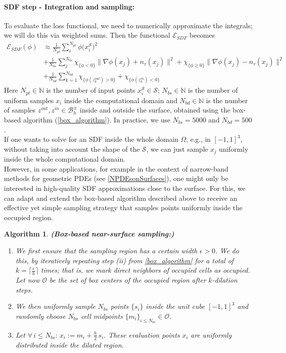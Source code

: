 \documentclass[draft,12pt,openany]{book}
\def\S{\mathcal{S}}
\theoremstyle{plainnormal}
\newtheorem{algorithm}[theorem]{Algorithm}
\theoremstyle{remark}
\begin{document}
\paragraph{SDF step - Integration and sampling:} To evaluate the loss functional, we need to numerically approximate the integrals; we will do this via weighted sums. Then the functional $\mathcal{E}_{SDF}$ becomes
\begin{align*}
    \mathcal{E}_{SDF}(\phi) &\approx 
 \frac{1}{N_{pt}}\sum_i^{N_{pt}}\phi\big( x_i^\S\big)^2\\ &+ \frac{1}{N_{bs}}\sum_j^{N_{bs}}
\chi_{\{\phi < 0\}} \|\nabla \phi(x_j) + n_\tau(x_j)\|^2 + \chi_{\{\phi \geq 0\}} \|\nabla \phi(x_j) - n_\tau(x_j)\|^2  \\&+\frac{1}{N_{bd}} \sum^{N_{bd}}_{k = 1}\chi_{\{\phi(z^{out}_k) > 0\}} + \chi_{\{\phi(z^{in}_k) < 0\}}
\end{align*}
Here $N_{pt}\in \mathbb{N}$ is the number of input points $x_i^\S \in \mathcal S$;  $N_{bs}\in \mathbb{N}$ is the number of uniform samples $x_i$ inside the computational domain and $N_{bd}\in \mathbb{N}$ is the number of samples $z^{out}, z^{in} \in \mathcal{B}_h^\pm$ inside and outside the surface, obtained using the box-based algorithm (\cref{box_algorithm}). In practice, we use $N_{bs} = 5000$ and $N_{bd} = 500$.\\
If one wants to solve for an SDF inside the whole domain $\Omega$, e.g., in $[-1,1]^3$, without taking into account the shape of the $\S$, we can just sample $x_j$ uniformly inside the whole computational domain.\\
However, in some applications, for example in the context of narrow-band methods for geometric PDEs (see \cref{NPDEsonSurfaces}), one might only be interested in high-quality SDF approximations close to the surface. For this, we can adapt and extend the box-based algorithm described above to receive an effective yet simple sampling strategy that samples points uniformly inside the occupied region.
\begin{algorithm}\label{clever_sampling}\textbf{(Box-based near-surface sampling:)}
  \begin{enumerate}
      \item We first ensure that the sampling region has a certain width $\epsilon > 0$. We do this, by iteratively repeating step (ii) from \cref{box_algorithm} for a total of $k = \lceil \frac{\epsilon}{h} \rceil$ times; that is, we mark direct neighbors of occupied cells as occupied. Let now $\mathcal{O}$ be the set of box centers of the occupied region after $k$-dilation steps. 
      \item We then uniformly sample $N_{bs}$ points $\{s_i\}$ inside the unit cube $[-1,1]^3$ and randomly choose $N_{bs}$ cell midpoints $\{m_i\}_{i \leq N_{bs}} \in \mathcal O$.
      \item Let $\forall\, i \leq N_{bs}: \,x_i := m_i + \frac{h}{2}\,s_i$. These evaluation points $x_i$ are uniformly distributed inside the dilated region.
  \end{enumerate}  
\end{algorithm}
\end{document}
